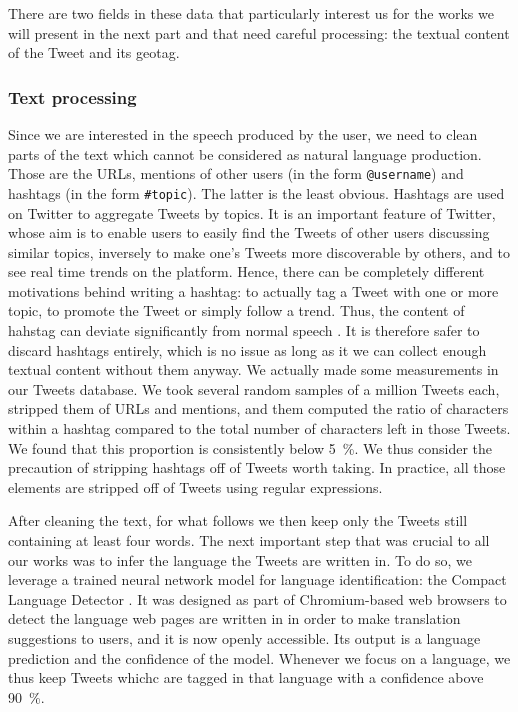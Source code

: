 \documentclass[../thesis.tex]{subfiles}
\begin{document}
There are two fields in these data that particularly interest us for the works we will
present in the next part and that need careful processing: the textual content of the
Tweet and its geotag.

\subsubsection{Text processing}
\label{sec:method_text_process}
Since we are interested in the speech produced by the user, we need to clean parts of
the text which cannot be considered as natural language production. Those are the URLs,
mentions of other users (in the form \texttt{@username}) and hashtags (in the form
\texttt{\#topic}). The latter is the least obvious. Hashtags are used on Twitter to
aggregate Tweets by topics. It is an important feature of Twitter, whose aim is to
enable users to easily find the Tweets of other users discussing similar topics,
inversely to make one's Tweets more discoverable by others, and to see real time trends
on the platform. Hence, there can be completely different motivations behind writing a
hashtag: to actually tag a Tweet with one or more topic, to promote the Tweet or simply
follow a trend. Thus, the content of hahstag can deviate significantly from normal
speech \cite{PageLinguisticsSelfbranding2012}. It is therefore safer to discard hashtags
entirely, which is no issue as long as it we can collect enough textual content without
them anyway. We actually made some measurements in our Tweets database. We took several
random samples of a million Tweets each, stripped them of URLs and mentions, and them
computed the ratio of characters within a hashtag compared to the total number of
characters left in those Tweets. We found that this proportion is consistently below
\SI{5}{\percent}. We thus consider the precaution of stripping hashtags off of Tweets
worth taking. In practice, all those elements are stripped off of Tweets using regular
expressions.

After cleaning the text, for what follows we then keep only the Tweets still containing
at least four words. The next important step that was crucial to all our works was to
infer the language the Tweets are written in. To do so, we leverage a trained neural
network model for language identification: the Compact Language Detector
\cite{SalcianuCompactLanguage2023}. It was designed as part of Chromium-based web
browsers to detect the language web pages are written in in order to make translation
suggestions to users, and it is now openly accessible. Its output is a language
prediction and the confidence of the model. Whenever we focus on a language, we thus
keep Tweets whichc are tagged in that language with a confidence above
\SI{90}{\percent}.
\end{document}
